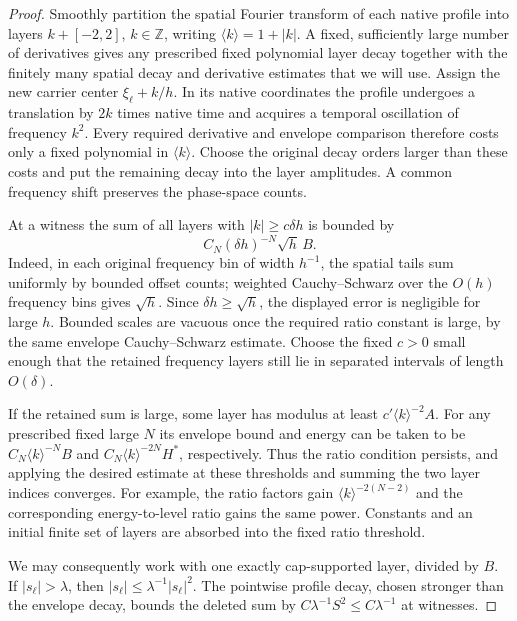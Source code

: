 \begin{proof}
Smoothly partition the spatial Fourier transform of each native profile
into layers $k+[-2,2]$, $k\in\mathbb Z$, writing
$\langle k\rangle=1+|k|$.  A fixed, sufficiently large number of
derivatives gives any prescribed fixed polynomial layer decay together
with the finitely many spatial decay and derivative estimates that we
will use.  Assign the new carrier center $\xi_\ell+k/h$.
In its native coordinates the profile undergoes a translation by
$2k$ times native time and acquires a temporal oscillation of frequency
$k^2$.  Every required derivative and envelope comparison therefore
costs only a fixed polynomial in $\langle k\rangle$.  Choose the
original decay orders larger than these costs and put the remaining
decay into the layer amplitudes.  A common frequency shift preserves
the phase-space counts.

At a witness the sum of all layers with $|k|\geq c\delta h$ is bounded
by
\[
 C_N(\delta h)^{-N}\sqrt h\,B.
\]
Indeed, in each original frequency bin of width $h^{-1}$, the spatial
tails sum uniformly by bounded offset counts; weighted
Cauchy--Schwarz over the $O(h)$ frequency bins gives $\sqrt h$.
Since $\delta h\geq\sqrt h$, the displayed error is negligible for
large $h$.  Bounded scales are vacuous once the required ratio constant
is large, by the same envelope Cauchy--Schwarz estimate.
Choose the fixed $c>0$ small enough that the retained frequency layers
still lie in separated intervals of length $O(\delta)$.

If the retained sum is large, some layer has modulus at least
$c'\langle k\rangle^{-2}A$.  For any prescribed fixed large $N$ its
envelope bound and energy can be taken to be
$C_N\langle k\rangle^{-N}B$ and
$C_N\langle k\rangle^{-2N}H^*$, respectively.  Thus the ratio condition
persists, and applying the desired estimate at these thresholds and
summing the two layer indices converges.  For example, the ratio
factors gain $\langle k\rangle^{-2(N-2)}$ and the corresponding
energy-to-level ratio gains the same power.  Constants and an initial
finite set of layers are absorbed into the fixed ratio threshold.

We may consequently work with one exactly cap-supported layer, divided
by $B$.  If $|s_\ell|>\lambda$, then
$|s_\ell|\leq\lambda^{-1}|s_\ell|^2$.  The pointwise profile decay,
chosen stronger than the envelope decay, bounds the deleted sum by
$C\lambda^{-1}S^2\leq C\lambda^{-1}$ at witnesses.


\end{proof}
